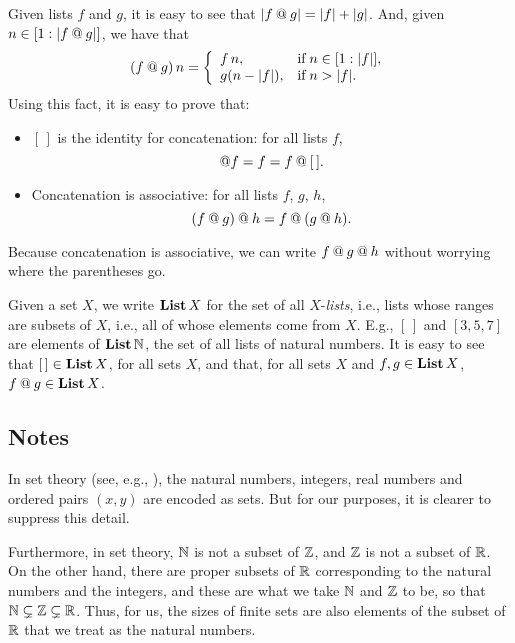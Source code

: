 Given lists $f$ and $g$, it is easy to see that $|f\mathbin{@} g| =
|f| + |g|$.  And, given $n\in[1:|f\mathbin{@} g|]$,
we have that
\begin{displaymath}
(f\myconcat g)\,n =
\casesdef{f\,n,}{\eqtxtr{if}n\in[1:|f|],}%
         {g(n-|f|),}{\eqtxtr{if}n>|f| .}
\end{displaymath}
Using this fact, it is easy to prove that:
\begin{itemize}
\item $[\,]$ is the identity for concatenation: for all lists $f$,
%
%
%
  \begin{displaymath}
    [\,]\myconcat f = f = f\myconcat [\,] .
  \end{displaymath}

\item Concatenation is associative: for all lists $f$, $g$, $h$,
%
%
%
  \begin{displaymath}
    (f\mathbin{@} g)\mathbin{@} h = f\mathbin{@}(g\mathbin{@} h) .
  \end{displaymath}
\end{itemize}
Because concatenation is associative, we can write
$f\mathbin{@} g\mathbin{@} h$ without worrying where the parentheses go.

Given a set $X$, we write $\mathbf{List}\,X$ for the set of all
$X$-\emph{lists}, i.e., lists whose
%
%
%
%
ranges are subsets of $X$, i.e., all of whose elements come
from $X$.  E.g., $[\,]$ and $[3,5,7]$ are elements of $\mathbf{List}\,\mathbb{N}$,
the set of all lists of natural numbers.  It is easy to see that
$[\,]\in\mathbf{List}\,X$, for all sets $X$, and that, for all sets $X$ and
$f,g\in\mathbf{List}\,X$, $f\mathbin{@} g\in\mathbf{List}\,X$.
%
%

\subsection{Notes}

In set theory (see, e.g., \cite{Enderton77}), the natural numbers,
integers, real numbers and ordered pairs $(x,y)$ are encoded as sets.
But for our purposes, it is clearer to suppress this detail.

Furthermore, in set theory, $\mathbb{N}$ is not a subset of $\mathbb{Z}$, and
$\mathbb{Z}$ is not a subset of $\mathbb{R}$.  On the other hand, there are
proper subsets of $\mathbb{R}$ corresponding to the natural numbers and
the integers, and these are what we take $\mathbb{N}$ and $\mathbb{Z}$ to be, so
that $\mathbb{N}\subsetneq\mathbb{Z}\subsetneq\mathbb{R}$. Thus, for us, the sizes of
finite sets are also elements of the subset of $\mathbb{R}$ that we
treat as the natural numbers.
%

